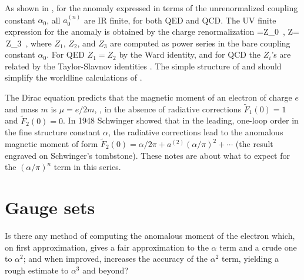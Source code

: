 As shown in , for the anomaly 
expressed in terms of the unrenormalized coupling constant $\alpha_0$,
all $a_{0}^{(n)}$ are IR finite, for both QED and QCD.
The UV finite expression for the anomaly  is obtained
by the charge renormalization
\beq
\alpha=Z\alpha_0
\,,\qquad
Z= \,Z_3
\,,
where
$Z_1$,
$Z_2$, and
$Z_3$
are computed as power series in the bare coupling constant $\alpha_0$.
For QED $Z_1=Z_2$ by the Ward identity, and for QCD the $Z_i$'s are
related by the Taylor-Slavnov identities
. The simple structure of  and
 should simplify the worldline calculations of
.

The Dirac equation predicts that the magnetic moment of an
electron of charge $e$ and mass $m$ is ${ {\mu}} = {e}/{2 m} $,
\ie, in the absence of radiative corrections
$\tilde{F}_1(0)=1$ and $\tilde{F}_2(0)=0$. In 1948 Schwinger showed that in
the leading, one-loop order in the fine structure constant $\alpha$, the
radiative corrections lead to the anomalous magnetic moment of form
$\tilde{F}_2(0)={\alpha}/{2\pi}+ a^{(2)}\left({\alpha}/{\pi}\right)^2 +
\cdots$
(the result engraved on Schwinger's
{tombstone}).
These notes are about what to expect for the $\left({\alpha}/{\pi}\right)^n$
term in this series.

\section{Gauge sets}
\label{sect:finitness}

\begin{bartlett}{
Is there any method of computing the anomalous moment of the
electron which, on first approximation, gives a fair approximation to the
$\alpha$ term and a crude one to $\alpha^2$; and when improved, increases
the accuracy of the $\alpha^2$ term, yielding a rough estimate to
$\alpha^3$ and beyond?
        }
\end{bartlett}

\bigskip

